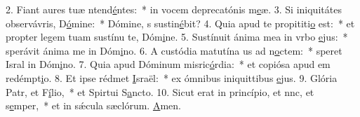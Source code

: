 2. Fiant aures tuæ ntend\uline{é}ntes:~* in vocem deprecatónis m\uline{e}æ.
3. Si iniquitátes observávris, D\uline{ó}mine:~* Dómine, s sustin\uline{é}bit?
4. Quia apud te propititi\uline{o} est:~* et propter legem tuam sustínu te, Dóm\uline{i}ne.
5. Sustínuit ánima mea in vrbo \uline{e}jus:~* sperávit ánima me in Dóm\uline{i}no.
6. A custódia matutína us ad n\uline{o}ctem:~* speret Isral in Dóm\uline{i}no.
7. Quia apud Dóminum misric\uline{ó}rdia:~* et copiósa apud em redémpt\uline{i}o.
8. Et ipse rédmet \uline{I}sraël:~* ex ómnibus iniquittibus \uline{e}jus.
9. Glória Patr, et F\uline{í}lio,~* et Spirtui S\uline{a}ncto.
10. Sicut erat in princípio, et nnc, et s\uline{e}mper,~* et in sǽcula sæclórum. \uline{A}men.
